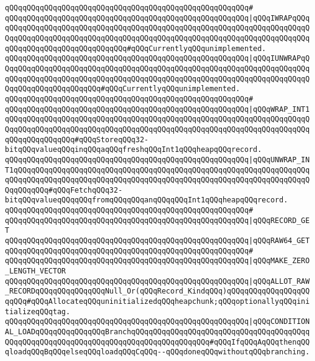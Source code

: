 \verb|qQQqqQQqqQQqqQQqqQQqqQQqqQQqqQQqqQQqqQQqqQQqqQQqqQQqqQQq#|\newline
\verb|qQQqqQQqqQQqqQQqqQQqqQQqqQQqqQQqqQQqqQQqqQQqqQQqqQQqqQQq|\verb#|qQQqIWRAPqQQqqQQqqQQqqQQqqQQqqQQqqQQqqQQqqQQqqQQqqQQqqQQqqQQqqQQqqQQqqQQqqQQqqQQqqQQqqQQqqQQqqQQqqQQqqQQqqQQqqQQqqQQqqQQqqQQqqQQqqQQqqQQqqQQqqQQqqQQqqQQqqQQqqQQqqQQqqQQqqQQqqQQqqQQq#\verb|#qQQqCurrentlyqQQqunimplemented.|\newline
\verb|qQQqqQQqqQQqqQQqqQQqqQQqqQQqqQQqqQQqqQQqqQQqqQQqqQQqqQQq|\verb#|qQQqIUNWRAPqQQqqQQqqQQqqQQqqQQqqQQqqQQqqQQqqQQqqQQqqQQqqQQqqQQqqQQqqQQqqQQqqQQqqQQqqQQqqQQqqQQqqQQqqQQqqQQqqQQqqQQqqQQqqQQqqQQqqQQqqQQqqQQqqQQqqQQqqQQqqQQqqQQqqQQqqQQqqQQqqQQq#\verb|#qQQqCurrentlyqQQqunimplemented.|\newline
\verb|qQQqqQQqqQQqqQQqqQQqqQQqqQQqqQQqqQQqqQQqqQQqqQQqqQQqqQQq#|\newline
\verb|qQQqqQQqqQQqqQQqqQQqqQQqqQQqqQQqqQQqqQQqqQQqqQQqqQQqqQQq|\verb#|qQQqWRAP_INT1qQQqqQQqqQQqqQQqqQQqqQQqqQQqqQQqqQQqqQQqqQQqqQQqqQQqqQQqqQQqqQQqqQQqqQQqqQQqqQQqqQQqqQQqqQQqqQQqqQQqqQQqqQQqqQQqqQQqqQQqqQQqqQQqqQQqqQQqqQQqqQQqqQQqqQQqqQQq#\verb|#qQQqStoreqQQq32-bitqQQqvalueqQQqinqQQqaqQQqfreshqQQqInt1qQQqheapqQQqrecord.|\newline
\verb|qQQqqQQqqQQqqQQqqQQqqQQqqQQqqQQqqQQqqQQqqQQqqQQqqQQqqQQq|\verb#|qQQqUNWRAP_INT1qQQqqQQqqQQqqQQqqQQqqQQqqQQqqQQqqQQqqQQqqQQqqQQqqQQqqQQqqQQqqQQqqQQqqQQqqQQqqQQqqQQqqQQqqQQqqQQqqQQqqQQqqQQqqQQqqQQqqQQqqQQqqQQqqQQqqQQqqQQqqQQqqQQq#\verb|#qQQqFetchqQQq32-bitqQQqvalueqQQqqQQqfromqQQqqQQqanqQQqqQQqInt1qQQqheapqQQqrecord.|\newline
\verb|qQQqqQQqqQQqqQQqqQQqqQQqqQQqqQQqqQQqqQQqqQQqqQQqqQQqqQQq#|\newline
\verb|qQQqqQQqqQQqqQQqqQQqqQQqqQQqqQQqqQQqqQQqqQQqqQQqqQQqqQQq|\verb#|qQQqRECORD_GET#\newline
\verb|qQQqqQQqqQQqqQQqqQQqqQQqqQQqqQQqqQQqqQQqqQQqqQQqqQQqqQQq|\verb#|qQQqRAW64_GET#\newline
\verb|qQQqqQQqqQQqqQQqqQQqqQQqqQQqqQQqqQQqqQQqqQQqqQQqqQQqqQQq#|\newline
\verb|qQQqqQQqqQQqqQQqqQQqqQQqqQQqqQQqqQQqqQQqqQQqqQQqqQQqqQQq|\verb#|qQQqMAKE_ZERO_LENGTH_VECTOR#\newline
\verb|qQQqqQQqqQQqqQQqqQQqqQQqqQQqqQQqqQQqqQQqqQQqqQQqqQQqqQQq|\verb#|qQQqALLOT_RAW_RECORDqQQqqQQqqQQqqQQqNull_Or(qQQqRecord_KindqQQq)qQQqqQQqqQQqqQQqqQQqqQQq#\verb|#qQQqAllocateqQQquninitializedqQQqheapchunk;qQQqoptionallyqQQqinitializeqQQqtag.|\newline
\verb|qQQqqQQqqQQqqQQqqQQqqQQqqQQqqQQqqQQqqQQqqQQqqQQqqQQqqQQq|\verb#|qQQqCONDITIONAL_LOADqQQqqQQqqQQqqQQqBranchqQQqqQQqqQQqqQQqqQQqqQQqqQQqqQQqqQQqqQQqqQQqqQQqqQQqqQQqqQQqqQQqqQQqqQQqqQQqqQQqqQQqqQQq#\verb|#qQQqIfqQQqAqQQqthenqQQqloadqQQqBqQQqelseqQQqloadqQQqCqQQq--qQQqdoneqQQqwithoutqQQqbranching.|\newline
